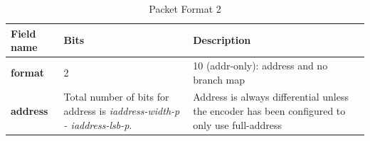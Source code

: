 \begin{table}[!h]
    \centering
    \caption{Packet Format 2}
    \label{tab:te_inst2}
    \begin{tabulary}{\textwidth}{|l|p{35mm}|p{80mm}|}
        \hline
        {\bf Field name} & {\bf Bits} & {\bf Description} \\
        \hline
        \textbf{format}	& 2	& 10 (addr-only): address and no branch map\\
        \hline
        \textbf{address} & Total number of bits 
                  for address is
                  \textit {iaddress-width-p - iaddress-lsb-p}. & 
                  Address is always differential unless the encoder has been configured to only use full-address\\ 
        \hline
    \end{tabulary}
\end{table}

